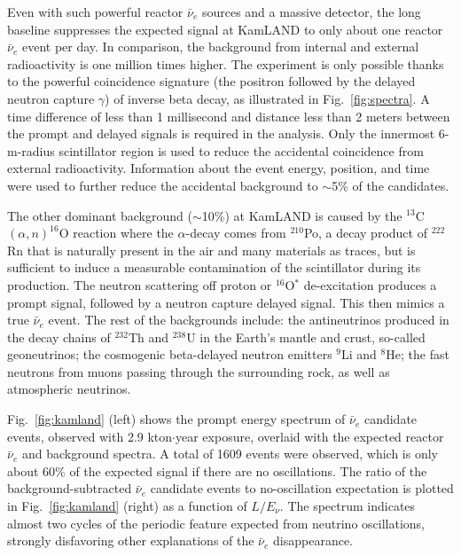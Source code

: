 \documentclass[aps,twocolumn,preprintnumbers,amsmath,superscriptaddress,amssymb,floats,nofootinbib]{revtex4-1}
\begin{document}
Even with such powerful reactor $\bar\nu_e$ sources and a massive detector, the long baseline suppresses the expected signal at KamLAND to only about one reactor $\bar\nu_e$ event per day. 
In comparison, the background from internal and external radioactivity is one million times higher. 
The experiment is only possible thanks to the powerful coincidence signature (the positron followed by the delayed neutron capture $\gamma$) of inverse beta decay, as illustrated in Fig.~\ref{fig:spectra}. 
A time difference of less than 1 millisecond and distance less than 2 meters between the prompt and delayed signals is required in the analysis. 
Only the innermost 6-m-radius scintillator region is used to reduce the accidental coincidence from external radioactivity. 
Information about the event energy, position, and time were used to further reduce the accidental background to $\sim$5\% of the candidates.

The other dominant background ($\sim$10\%) at KamLAND is caused by the $^{13}$C$(\alpha,n)^{16}$O reaction where the $\alpha$-decay comes from $^{210}$Po, 
a decay product of $^{222}$Rn that is naturally present in the air and many materials as traces, but is sufficient to induce a measurable contamination of the scintillator during its production.
The neutron scattering off proton or $^{16}$O$^*$ de-excitation produces a prompt signal, followed by a neutron capture delayed signal. This then mimics a true $\bar\nu_e$ event. The rest of the backgrounds include: the antineutrinos produced in the decay chains of $^{232}$Th and $^{238}$U in the Earth's mantle and crust, so-called geoneutrinos; the cosmogenic beta-delayed neutron emitters $^{9}$Li and $^{8}$He;  the fast neutrons from muons passing through the surrounding rock, as well as atmospheric neutrinos. 

Fig.~\ref{fig:kamland} (left) shows the prompt energy spectrum of $\bar\nu_e$ candidate
events, observed with 2.9 kton$\cdot$year exposure, overlaid with the expected reactor $\bar\nu_{e}$ and background spectra. A total of 1609 events were observed, which is only about 60\% of the expected signal if there are no oscillations. The ratio of the background-subtracted $\bar\nu_e$ candidate events to no-oscillation expectation is plotted in Fig.~\ref{fig:kamland} (right) as a function of $L/E_{\nu}$. The spectrum indicates almost two cycles of the periodic feature expected from neutrino oscillations, strongly disfavoring other explanations of the $\bar\nu_e$ disappearance.
\end{document}
